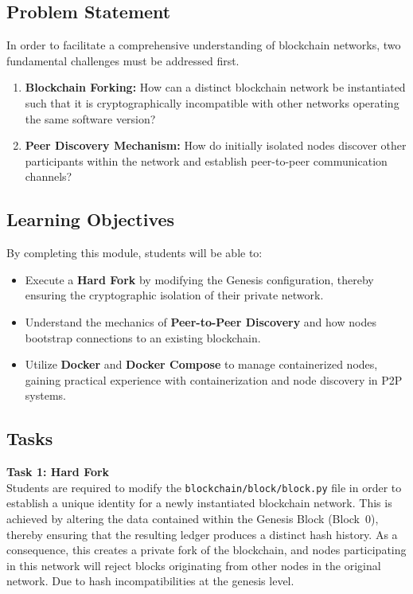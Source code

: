 \subsection{Problem Statement}

In order to facilitate a comprehensive understanding of blockchain networks, two fundamental challenges must be addressed first.

\begin{enumerate}
    \item \textbf{Blockchain Forking:} How can a distinct blockchain network be instantiated such that it is cryptographically incompatible with other networks operating the same software version?
    
    \item \textbf{Peer Discovery Mechanism:} How do initially isolated nodes discover other participants within the network and establish peer-to-peer communication channels?
\end{enumerate}

\subsection{Learning Objectives}
By completing this module, students will be able to:
\begin{itemize}
    \item Execute a \textbf{Hard Fork} by modifying the Genesis configuration, thereby ensuring the cryptographic isolation of their private network.
    \item Understand the mechanics of \textbf{Peer-to-Peer Discovery} and how nodes bootstrap connections to an existing blockchain.
    \item Utilize \textbf{Docker} and \textbf{Docker Compose} to manage containerized nodes, gaining practical experience with containerization and node discovery in P2P systems.
\end{itemize}


\subsection{Tasks}

\textbf{Task 1: Hard Fork} \\

Students are required to modify the \texttt{blockchain/block/block.py} file in order to establish a unique identity for a newly instantiated blockchain network. This is achieved by altering the data contained within the Genesis Block (Block~0), thereby ensuring that the resulting ledger produces a distinct hash history. As a consequence, this creates a private fork of the blockchain, and nodes participating in this network will reject blocks originating from other nodes in the original network. Due to hash incompatibilities at the genesis level.


